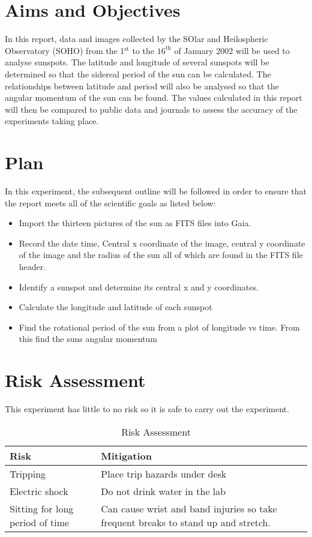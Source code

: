 \documentclass[10pt]{article}
\begin{document}
\section{Aims and Objectives}

In this report, data and images collected by the SOlar and Heilospheric Observatory (SOHO) from the 1$^{\text{st}}$ to the $16^{\text{th}}$ of January 2002 will be used to analyse sunspots. The latitude and longitude of several sunspots will be determined so that the sidereal period of the sun can be calculated. The relationships between latitude and period will also be analysed so that the angular momentum of the sun can be found. The values calculated in this report will then be compared to public data and journals to assess the accuracy of the experiments taking place.  

\section{Plan}
In this experiment, the subsequent outline will be followed in order to ensure that the report meets all of the scientific goals as listed below:
\begin{itemize}
	\item Import the thirteen pictures of the sun as FITS files into Gaia.
	\item Record the date time, Central x coordinate of the image, central y coordinate of the image and the radius of the sun all of which are found in the FITS file header.
	\item Identify a sunspot and determine its central x and y coordinates.
	\item Calculate the longitude and latitude of each sunspot
	\item Find the rotational period of the sun from a plot of longitude vs time. From this find the suns angular momentum
\end{itemize}
\section{Risk Assessment}
This experiment has little to no risk so it is safe to carry out the experiment.
\begin{table}[H]
	\centering
	\caption{Risk Assessment}
	\begin{tabular}{p{}p{}}
		\toprule
		Risk & Mitigation \\
		\midrule
		Tripping & Place trip hazards under desk \\
		\addlinespace
		\cellcolor{gray!10} Electric shock & \cellcolor{gray!10} Do not drink water in the lab \\
		\addlinespace
		Sitting for long period of time & Can cause wrist and band injuries so take frequent breaks to stand up and stretch. \\
		\bottomrule
	\end{tabular}
\end{table}
\end{document}
